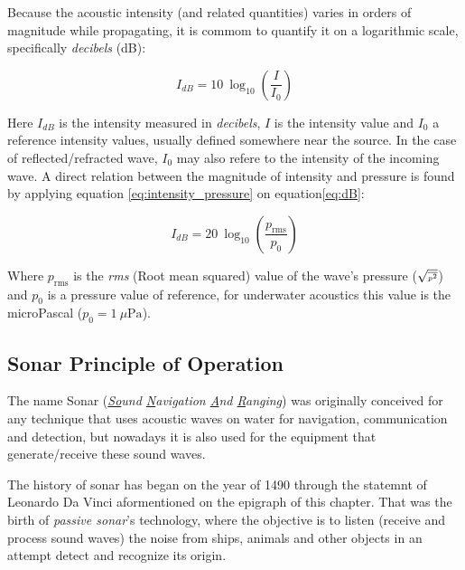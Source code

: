 

Because the acoustic intensity (and related quantities) varies in orders of
magnitude while propagating, it is commom to quantify it on a logarithmic scale,
specifically \textit{decibels} (dB)\cite{LURTON}:

\begin{equation}\label{eq:dB}
I_{dB} = 10~\log_{10}\left(\frac{I}{I_0}\right)
\end{equation} 

Here $I_{dB}$ is the intensity measured in \textit{decibels}, $I$ is the
intensity value and $I_0$ a reference intensity values, usually defined somewhere near the
source. In the case of reflected/refracted wave, $I_0$ may also refere to
the intensity of the incoming wave. A direct relation between the magnitude of
intensity and pressure is found by applying equation \ref{eq:intensity_pressure}
on equation\ref{eq:dB}:

\begin{equation}\label{eq:dB2}
I_{dB} = 20~\log_{10}\left(\frac{p_{\text{rms}}}{p_0}\right)
\end{equation}

Where $p_{\text{rms}}$ is the \textit{rms} (Root mean squared) value of the
wave's pressure ({\small $\sqrt{\text{\tiny \(\overline{p^2}\)}}$}) and $p_0$ is
a pressure value of reference, for underwater acoustics this value is the
microPascal (\(p_0 = 1~\mu\text{Pa} \))\cite{LURTON}.


\subsection{Sonar Principle of Operation}

The name Sonar (\textit{\underline{So}und \underline{N}avigation \underline{A}nd
\underline{R}anging}) was originally conceived for any technique that uses
acoustic waves on water for navigation, communication and detection, but
nowadays it is also used for the equipment that generate/receive these
sound waves.

The history of sonar has began on the year of 1490 through
the statemnt of Leonardo Da Vinci aformentioned on the epigraph 
of this chapter\cite{fahy1998fundamentals}. That was the birth of
\textit{passive sonar}'s technology, where the objective is to listen (receive
and process sound waves) the noise from ships, animals and other objects in an attempt detect and
recognize its origin. 

